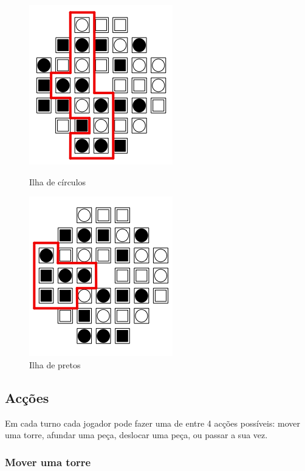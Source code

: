 \documentclass[a4paper]{article}
\begin{document}
\begin{figure}[h]

\begin{minipage}{0.5\linewidth}
\centering
\includegraphics[scale=0.75]{island1.png}
\caption{Ilha de círculos}
\label{fig:circleisland}
\end{minipage}
\quad
\begin{minipage}{0.5\linewidth}
\centering
\includegraphics[scale=0.75]{island2.png}
\caption{Ilha de pretos}
\label{fig:blackisland}
\end{minipage}

\end{figure}


\subsection{Acções}
\label{sec:actions}

Em cada turno cada jogador pode fazer uma de entre 4 acções possíveis: mover uma torre, afundar uma peça, deslocar uma peça, ou passar a sua vez.

\subsubsection{Mover uma torre}
\end{document}

